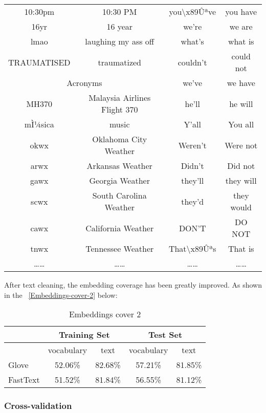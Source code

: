 \begin{table}[htbp]
\begin{tabular}{cccc}
		10:30pm &  10:30 PM & you\textbackslash{}x89Ûªve &  you have \\
		16yr  &  16 year & we're &  we are \\
		lmao  &  laughing my ass off & what's &  what is \\
		TRAUMATISED &  traumatized & couldn't &  could not \\
		\cmidrule{1-2}    \multicolumn{2}{c}{Acronyms} & we've &  we have \\
		\cmidrule{1-2}    MH370 &  Malaysia Airlines Flight 370 & he'll &  he will \\
		mÌ¼sica &  music & Y'all &  You all \\
		okwx  &  Oklahoma City Weather & Weren't &  Were not \\
		arwx  &  Arkansas Weather & Didn't &  Did not \\
		gawx  &  Georgia Weather & they'll &  they will \\
		scwx  &  South Carolina Weather & they'd &  they would \\
		cawx  &  California Weather & DON'T &  DO NOT \\
		tnwx  &  Tennessee Weather & That\textbackslash{}x89Ûªs &  That is \\
		……    & ……    & ……    & …… \\
		\bottomrule
	\end{tabular}%
	\label{tab:Text-Cleaning}%
\end{table}%


After text cleaning, the embedding coverage has been greatly improved.
As shown in the ~\cref{Embeddings-cover-2} below:
\begin{table}[htbp]
	\centering
	\caption{Embeddings cover 2}
	\begin{tabular}{lcccc}
		\toprule
		& \multicolumn{2}{c}{Training Set} & \multicolumn{2}{c}{Test Set} \\
		\midrule
		& vocabulary & text  & vocabulary & text \\
		\midrule
		Glove & 52.06\% & 82.68\% & 57.21\% & 81.85\% \\
		FastText & 51.52\% & 81.84\% & 56.55\% & 81.12\% \\
		\bottomrule
	\end{tabular}%
	\label{tab:Embeddings-cover-2}%
\end{table}%


\subsubsection{Cross-validation}
\

